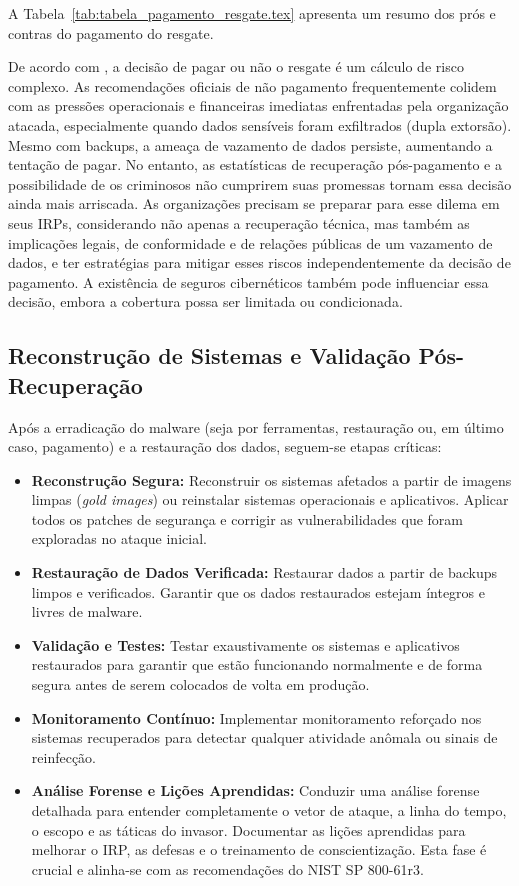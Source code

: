 A Tabela~\ref{tab:tabela_pagamento_resgate.tex} apresenta um resumo dos prós e contras do pagamento do resgate.



De acordo com \cite{HalcyonFinancialImpactRansomware}, a decisão de pagar ou não o resgate é um cálculo de risco complexo. 
As recomendações oficiais de não pagamento 
frequentemente colidem com as pressões operacionais e financeiras imediatas enfrentadas pela organização atacada, 
especialmente quando dados sensíveis foram exfiltrados (dupla extorsão). Mesmo com backups, a ameaça de vazamento de dados 
persiste, aumentando a tentação de pagar. No entanto, as estatísticas de recuperação pós-pagamento e a possibilidade de os 
criminosos não cumprirem suas promessas tornam essa decisão ainda mais arriscada. As organizações precisam se preparar para 
esse dilema em seus IRPs, considerando não apenas a recuperação técnica, mas também as implicações legais, de conformidade e de 
relações públicas de um vazamento de dados, e ter estratégias para mitigar esses riscos independentemente da decisão de pagamento. 
A existência de seguros cibernéticos também pode influenciar essa decisão, embora a cobertura possa ser limitada ou condicionada.

\subsection{Reconstrução de Sistemas e Validação Pós-Recuperação}

Após a erradicação do malware (seja por ferramentas, restauração ou, em último caso, pagamento) e a restauração dos dados, seguem-se etapas críticas:

\begin{itemize}
    \item \textbf{Reconstrução Segura:} Reconstruir os sistemas afetados a partir de imagens limpas (\textit{gold images}) ou reinstalar sistemas operacionais e aplicativos. Aplicar todos os patches de segurança e corrigir as vulnerabilidades que foram exploradas no ataque inicial.
    \item \textbf{Restauração de Dados Verificada:} Restaurar dados a partir de backups limpos e verificados. Garantir que os dados restaurados estejam íntegros e livres de malware.
    \item \textbf{Validação e Testes:} Testar exaustivamente os sistemas e aplicativos restaurados para garantir que estão funcionando normalmente e de forma segura antes de serem colocados de volta em produção.
    \item \textbf{Monitoramento Contínuo:} Implementar monitoramento reforçado nos sistemas recuperados para detectar qualquer atividade anômala ou sinais de reinfecção.
    \item \textbf{Análise Forense e Lições Aprendidas:} Conduzir uma análise forense detalhada para entender completamente o vetor de ataque, a linha do tempo, o escopo e as táticas do invasor. Documentar as lições aprendidas para melhorar o IRP, as defesas e o treinamento de conscientização. Esta fase é crucial e alinha-se com as recomendações do NIST SP 800-61r3.
\end{itemize}

